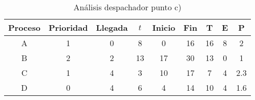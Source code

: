 \documentclass[11pt]{article}
\begin{document}
\begin{table}[h!]
\begin{center}
      \begin{tabular}{|c|c|c|c|c|c|c|c|c|}
          \hline
          Proceso & Prioridad & Llegada & $t$ & Inicio & Fin & T & E & P \\
          \hline
          A & 1 & 0 & 8 & 0 & 16 & 16 & 8 & 2 \\
          \hline
          B & 2 & 2 & 13 & 17 & 30 & 13 & 0 & 1 \\
          \hline
          C & 1 & 4 & 3 & 10 & 17 & 7 & 4 & 2.3 \\
          \hline
          D & 0 & 4 & 6 & 4 & 14 & 10 & 4 & 1.6 \\
          \hline
      \end{tabular}
      \caption{Análisis despachador punto c)}
\end{center}
\end{table}
\end{document}
